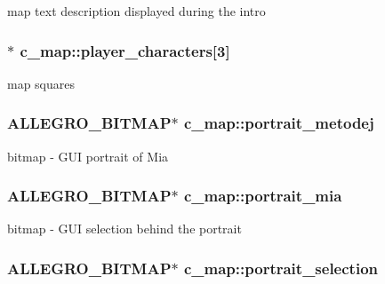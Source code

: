 map text description displayed during the intro \hypertarget{classc__map_a54131ed05249666c5ba32558a1df7d3e}{
\subsubsection[{player\-\_\-characters}]{$\ast$ c\-\_\-map\-::player\-\_\-characters\mbox{[}3\mbox{]}\hspace{0.3cm}{\ttfamily [protected]}}}\label{classc__map_a54131ed05249666c5ba32558a1df7d3e}
map squares \hypertarget{classc__map_af599cccfc6f1260aa5c1b0a236dca397}{
\subsubsection[{portrait\-\_\-metodej}]{\setlength{\rightskip}{0pt plus 5cm}A\-L\-L\-E\-G\-R\-O\-\_\-\-B\-I\-T\-M\-A\-P$\ast$ c\-\_\-map\-::portrait\-\_\-metodej\hspace{0.3cm}{\ttfamily [protected]}}}\label{classc__map_af599cccfc6f1260aa5c1b0a236dca397}
bitmap -\/ G\-U\-I portrait of Mia \hypertarget{classc__map_a9816fa208514e89a87693508fa5606ae}{
\subsubsection[{portrait\-\_\-mia}]{\setlength{\rightskip}{0pt plus 5cm}A\-L\-L\-E\-G\-R\-O\-\_\-\-B\-I\-T\-M\-A\-P$\ast$ c\-\_\-map\-::portrait\-\_\-mia\hspace{0.3cm}{\ttfamily [protected]}}}\label{classc__map_a9816fa208514e89a87693508fa5606ae}
bitmap -\/ G\-U\-I selection behind the portrait \hypertarget{classc__map_a297d97b704636559a28596af02cf9f79}{
\subsubsection[{portrait\-\_\-selection}]{\setlength{\rightskip}{0pt plus 5cm}A\-L\-L\-E\-G\-R\-O\-\_\-\-B\-I\-T\-M\-A\-P$\ast$ c\-\_\-map\-::portrait\-\_\-selection\hspace{0.3cm}{\ttfamily [protected]}}}\label{classc__map_a297d97b704636559a28596af02cf9f79}
